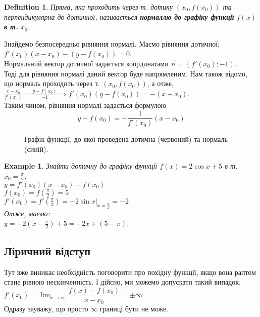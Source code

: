 \documentclass[a4paper, 14pt]{article}
\def\huge{\displaystyle}
\theoremstyle{theoremdd}
\theoremstyle{theoremdd}
\newtheorem{definition}[theorem]{Definition}
\theoremstyle{theoremdd}
\theoremstyle{theoremdd}
\newtheorem{example}[theorem]{Example}
\theoremstyle{theoremdd}
\theoremstyle{theoremdd}
\theoremstyle{theoremdd}
\theoremstyle{theoremdd}
\begin{document}
\begin{definition}
Пряма, яка проходить через т. дотику $(x_0, f(x_0))$ та перпендикулярна до дотичної, називається \textbf{нормаллю до графіку функції} $f(x)$ \textbf{в т.} $x_0$.
\end{definition}

Знайдемо безпосередньо рівняння нормалі. Маємо рівняння дотичної:
$f'(x_0)(x-x_0) - (y-f(x_0)) = 0$.\\
Нормальний вектор дотичної задається координатами $\vec{n} = (f'(x_0); -1)$.\\
Тоді для рівняння нормалі даний вектор буде напрямленим. Нам також відомо, що нормаль проходить через т. $(x_0,f(x_0))$, а отже,\\
$\huge \frac{x-x_0}{f'(x_0)} = \frac{y-f(x_0)}{-1} \Rightarrow f'(x_0)(y-f(x_0)) = -(x-x_0)$.\\
Таким чином, рівняння нормалі задається формулою $$y-f(x_0) = \huge -\frac{1}{f'(x_0)}(x-x_0)$$
\begin{figure}[H]
\centering
{}
	\caption*{Графік функції, до якої проведена дотична (червоний) та нормаль (синій).}
\end{figure}

\begin{example}
Знайти дотичну до графіку функції $f(x) = 2 \cos x + 5$ в т. $x_0 = \huge \frac{\pi}{2}$.\\
$y = f'(x_0)(x-x_0)+f(x_0)$\\
$f(x_0) = \huge f(\frac{\pi}{2}) = 5$\\
$f'(x_0) = \huge f'(\frac{\pi}{2}) = -2 \sin x |_{x = \frac{\pi}{2}} = -2$\\
Отже, маємо:\\
$y = \huge -2(x-\frac{\pi}{2}) + 5 = -2x + (5 - \pi)$.
\end{example}

\subsection*{Ліричний відступ}
Тут вже виникає необхідність поговорити про похідну функції, якщо вона раптом стане рівною нескінченність. І дійсно, ми можемо допускати такий випадок.\\
$f'(x_0) = \huge \lim_{x \to x_0} \dfrac{f(x)-f(x_0)}{x-x_0} = \pm \infty$\\
Одразу зауважу, що просто $\infty$ границі бути не може.
\end{document}

